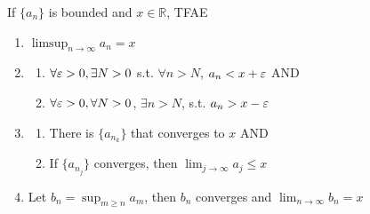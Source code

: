 \begin{theorem}
    \label{theorem:limsup-properties}
    If $\{ a_n \} $ is bounded and $x \in \mathbb{R}$, TFAE 
    \begin{enumerate}
        \item $\limsup_{n \to \infty} a_n = x$ 
        \item 
        \begin{enumerate}
            \item $\forall \varepsilon > 0, \exists N > 0$ s.t. 
            $\forall n > N$, $a_n < x + \varepsilon$ AND
            \item $\forall \varepsilon > 0, \forall N > 0$,
            $\exists n > N$, s.t. $a_n > x - \varepsilon$
        \end{enumerate}
        \item \begin{enumerate}
            \item There is $\{ a_{n_k} \} $ that converges to $x$ 
            AND
            \item If $\{ a_{n_j} \} $ converges, then 
            $\lim_{j \to \infty} a_j \leq x$
        \end{enumerate}
        \item Let $b_n = \sup_{m \geq n} a_m$, then $b_n$ converges
        and $\lim_{n \to \infty} b_n = x$
    \end{enumerate}
\end{theorem}






